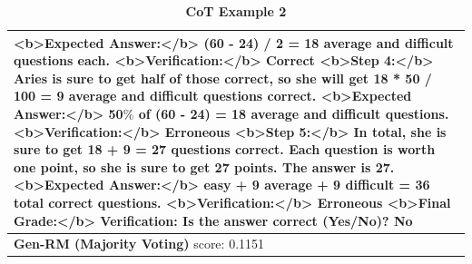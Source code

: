 \begin{table}[h]
\begin{tabular}{ |p{16.4cm}| }
{<b>Expected Answer:</b>\newline
(60 - 24) / 2 = 18 average and difficult questions each.\newline
<b>Verification:</b> Correct\newline
\newline
<b>Step 4:</b>\newline
Aries is sure to get half of those correct, {\color{red}so she will get 18 * 50 / 100 = 9 average and difficult questions correct.}\newline
<b>Expected Answer:</b>\newline
{\color{blue}50$\%$ of (60 - 24) = 18 average and difficult questions.}\newline
{\color{blue}<b>Verification:</b> Erroneous}\newline
\newline
<b>Step 5:</b>\newline
In total, she is sure to get 18 + 9 = 27 questions correct. Each question is worth one point, so she is sure to get 27 points. The answer is 27.\newline
<b>Expected Answer:</b>\newline
18 easy + 9 average + 9 difficult = 36 total correct questions.\newline
<b>Verification:</b> Erroneous\newline
\newline
<b>Final Grade:</b>\newline
{\color{blue}Verification: Is the answer correct (Yes/No)? No}
} \\
\midrule
{\textbf{Gen-RM (Majority Voting)} score: {\color{blue}0.1151}} \\
\midrule
\end{tabular}
\caption{
\textbf{{\genV} CoT Example 2}}
\label{cot-verifier-example-1-full-text}
\end{table}


